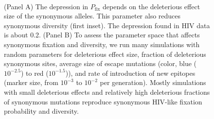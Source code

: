 \documentclass[rmp, twocolumn]{revtex4}
\begin{document}
\begin{figure}
\begin{center}
\\
\caption{(Panel A) The depression in $P_\text{fix}$ depends on the deleterious
effect size of the synonymous alleles. This parameter also reduces synonymous
diversity (first inset). The depression found in HIV data is about 0.2.
(Panel B) To assess the parameter space that affects synonymous fixation and
diversity, we run many simulations with random parameters for deleterious effect
size, fraction of deleterious synonymous sites, average size of escape
mutations (color, blue ($10^{-2.5}$) to red ($10^{-1.5}$)), and rate of
introduction of new epitopes (marker size, from $10^{-3}$ to $10^{-2}$ per
generation). Mostly simulations with small deleterious effects and relatively
high deleterious fractions of synonymous mutations reproduce synonymous HIV-like
fixation probability and diversity.}
\label{fig:simheat}
\end{center}
\end{figure}
\end{document}
